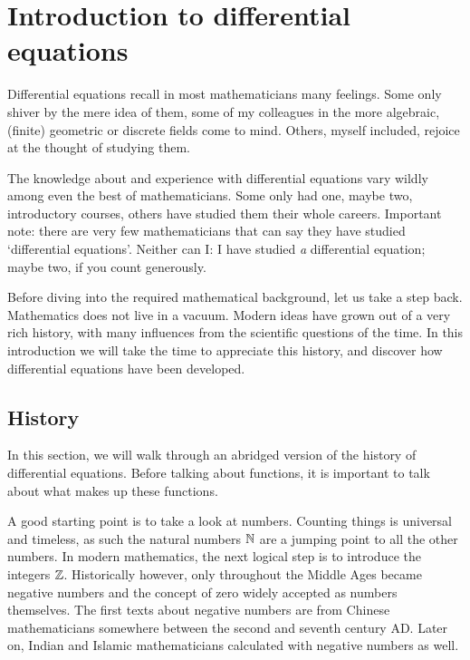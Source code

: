 


\chapter{Introduction to differential equations}\label{cha:c1}

Differential equations recall in most mathematicians many feelings. Some only shiver by the mere idea of them, some of my colleagues in the more algebraic, (finite) geometric or discrete fields come to mind. Others, myself included, rejoice at the thought of studying them.

The knowledge about and experience with differential equations vary wildly among even the best of mathematicians. Some only had one, maybe two, introductory courses, others have studied them their whole careers. Important note: there are very few mathematicians that can say they have studied `differential equations'. Neither can I: I have studied \emph{a} differential equation; maybe two, if you count generously.

Before diving into the required mathematical background, let us take a step back. Mathematics does not live in a vacuum. Modern ideas have grown out of a very rich history, with many influences from the scientific questions of the time. In this introduction we will take the time to appreciate this history, and discover how differential equations have been developed.

\section{History}

In this section, we will walk through an abridged version of the history of differential equations. Before talking about functions, it is important to talk about what makes up these functions.

A good starting point is to take a look at numbers. Counting things is universal and timeless, as such the natural numbers $\mathbb{N}$ are a jumping point to all the other numbers. In modern mathematics, the next logical step is to introduce the integers $\mathbb{Z}$. Historically however, only throughout the Middle Ages became negative numbers and the concept of zero widely accepted as numbers themselves. The first texts about negative numbers are from Chinese mathematicians somewhere between the second and seventh century AD. Later on, Indian and Islamic mathematicians calculated with negative numbers as well.


